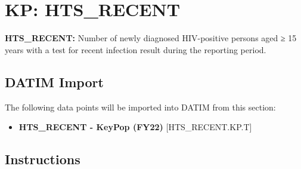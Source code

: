 \documentclass[
  openany]{book}
\providecommand{\tightlist}{%
  \setlength{\itemsep}{0pt}\setlength{\parskip}{0pt}}
\begin{document}
\hypertarget{kp-hts_recent}{%
\section{KP: HTS\_RECENT}\label{kp-hts_recent}}

\textbf{HTS\_RECENT:} Number of newly diagnosed HIV-positive persons aged ≥ 15
years with a test for recent infection result during the reporting
period.

\begin{table}[H]
\centering\begingroup\fontsize{12}{14}\selectfont

\endgroup{}
\end{table}

\hypertarget{datim-import-51}{%
\subsection{DATIM Import}\label{datim-import-51}}

The following data points will be imported into DATIM from this section:

\begin{itemize}
\tightlist
\item
  \textbf{HTS\_RECENT - KeyPop (FY22)} {[}HTS\_RECENT.KP.T{]}
\end{itemize}

\hypertarget{instructions-51}{%
\subsection{Instructions}\label{instructions-51}}
\end{document}
